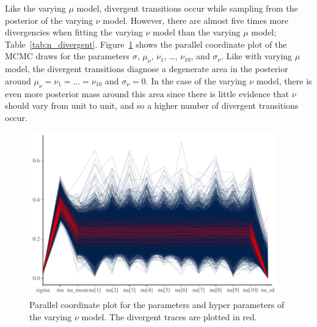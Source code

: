 

Like the varying $\mu$ model, divergent transitions occur while sampling from the posterior of the varying $\nu$ model. However, there are almost five times more divergencies when fitting the varying $\nu$ model than the varying $\mu$ model; Table~\ref{tab:n_divergent}. Figure~\ref{fig:pp_nu_parcoord} shows the parallel coordinate plot of the MCMC draws for the parameters $\sigma$, $\mu_\nu$, $\nu_1$, \ldots, $\nu_{10}$, and $\sigma_\nu$. Like with varying $\mu$ model, the divergent transitions diagnose a degenerate area in the posterior around $\mu_\nu = \nu_1 = \ldots = \nu_{10}$ and $\sigma_\nu = 0$. In the case of the varying $\nu$ model, there is even more posterior mass around this area since there is little evidence that $\nu$ should vary from unit to unit, and so a higher number of divergent transitions occur.

\begin{figure}
   \centering
   \includegraphics[width=0.95\textwidth]{./figures/ch-5/plot-pp-nu-parcoord.pdf}
   \caption{Parallel coordinate plot for the parameters and hyper parameters of the varying $\nu$ model. The divergent traces are plotted in red.}
   \label{fig:pp_nu_parcoord} 
\end{figure}

